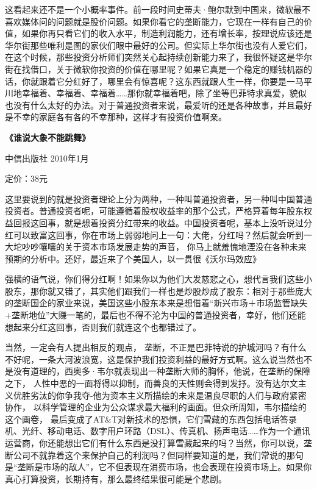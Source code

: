 这看起来还不是一个小概率事件。前一段时间史蒂夫·鲍尔默到中国来，微软最不喜欢媒体问的问题就是股价问题。如果你看它的垄断能力，它现在一样有自己的价值，如果你再只看它们的收入水平，制造利润能力，还有增长率，按理说应该还是华尔街那些唯利是图的家伙们眼中最好的公司。但实际上华尔街也没有人爱它们，在这个时候，那些投资分析师们突然关心起持续创新能力来了，我很怀疑这是华尔街在找借口，关于微软你投资的价值在哪里呢？如果它真是一个稳定的赚钱机器的话，你就跟着它分红好了，哪里会有惊喜呢？这东西就跟人生一样，你要是一马平川地幸福着、幸福着、幸福着\ldots{}\ldots{}那你就幸福着吧，除了坐等巴菲特求真爱，貌似也没有什么太好的办法。对于普通投资者来说，最爱听的还是各种故事，并且最好是不幸的家庭各有各的不幸那种，这样才有投资价值啊亲。

\textbf{《谁说大象不能跳舞》}

中信出版社 2010年1月

定价：38元

这里要说到的就是投资者理论上分为两种，一种叫普通投资者，另一种叫中国普通投资者。普通投资者呢，可能遵循着股权收益率的那个公式，严格算着每年股东权益回报这回事，就是想着投资分红带来的收益。中国投资者呢，基本上没听说过分红可以致富这回事，你在市场上弱弱地问上一句：大佬，分红吗？然后就会听到一大坨吵吵嚷嚷的关于资本市场发展走势的声音，
你马上就羞愧地湮没在各种未来预期的分析中。还好，最近来了个美国人，以一贯很《沃尔玛效应》

强横的语气说，你们得分红啊！如果你以为他们大发慈悲之心，想代言我们这些小股东，那你就又错了，其实他们跟我们一样也是炒股炒成了股东：相对于那些庞大的垄断国企的家业来说，美国这些小股东本来是想借着``新兴市场＋市场监管缺失+垄断地位''大赚一笔的，最后也不得不沦为中国的普通投资者，幸好，他们还能想起来分红这回事，否则我们就连这个也都错过了。

当然，一定会有人提出相反的观点，
垄断，不正是巴菲特说的护城河吗？有什么不好呢，一条大河波浪宽，这是保护我们投资利益的最好方式啊。这么说当然也不是没有道理的，西奥多·韦尔就表现出一种垄断大师的胸怀，他说，在垄断的保障之下，
人性中恶的一面将得以抑制，而善良的天性则会得到发抒。没有达尔文主义优胜劣汰的你争我夺-他为资本主义所描绘的未来是温良尽职的人们与政府紧密协作，
以科学管理的企业为公众谋求最大福利的画面。但众所周知，韦尔描绘的这个画卷，
最后变成了AT\&T对新技术的恐惧，它们雪藏的东西包括电话答录机、光纤、移动电话、数字用户环路（DSL）、传真机、扬声电话\ldots{}\ldots{}作为一个通讯运营商，你还能想出它们有什么东西是没打算雪藏起来的吗？当然，你可以说，垄断公司不就靠着这个来保护自己的利润吗？但同样要知道的是，我们常说的那句是``垄断是市场的敌人''，它不但表现在消费市场，也会表现在投资市场上。如果你真心打算投资，长期持有，那么最终结果很可能是个悲剧。

